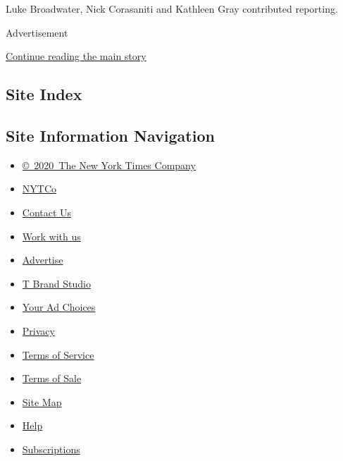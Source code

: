 Luke Broadwater, Nick Corasaniti and Kathleen Gray contributed
reporting.

Advertisement

\protect\hyperlink{after-bottom}{Continue reading the main story}

\hypertarget{site-index}{%
\subsection{Site Index}\label{site-index}}

\hypertarget{site-information-navigation}{%
\subsection{Site Information
Navigation}\label{site-information-navigation}}

\begin{itemize}
\tightlist
\item
  \href{https://help.nytimes3xbfgragh.onion/hc/en-us/articles/115014792127-Copyright-notice}{©~2020~The
  New York Times Company}
\end{itemize}

\begin{itemize}
\tightlist
\item
  \href{https://www.nytco.com/}{NYTCo}
\item
  \href{https://help.nytimes3xbfgragh.onion/hc/en-us/articles/115015385887-Contact-Us}{Contact
  Us}
\item
  \href{https://www.nytco.com/careers/}{Work with us}
\item
  \href{https://nytmediakit.com/}{Advertise}
\item
  \href{http://www.tbrandstudio.com/}{T Brand Studio}
\item
  \href{https://www.nytimes3xbfgragh.onion/privacy/cookie-policy\#how-do-i-manage-trackers}{Your
  Ad Choices}
\item
  \href{https://www.nytimes3xbfgragh.onion/privacy}{Privacy}
\item
  \href{https://help.nytimes3xbfgragh.onion/hc/en-us/articles/115014893428-Terms-of-service}{Terms
  of Service}
\item
  \href{https://help.nytimes3xbfgragh.onion/hc/en-us/articles/115014893968-Terms-of-sale}{Terms
  of Sale}
\item
  \href{https://spiderbites.nytimes3xbfgragh.onion}{Site Map}
\item
  \href{https://help.nytimes3xbfgragh.onion/hc/en-us}{Help}
\item
  \href{https://www.nytimes3xbfgragh.onion/subscription?campaignId=37WXW}{Subscriptions}
\end{itemize}
